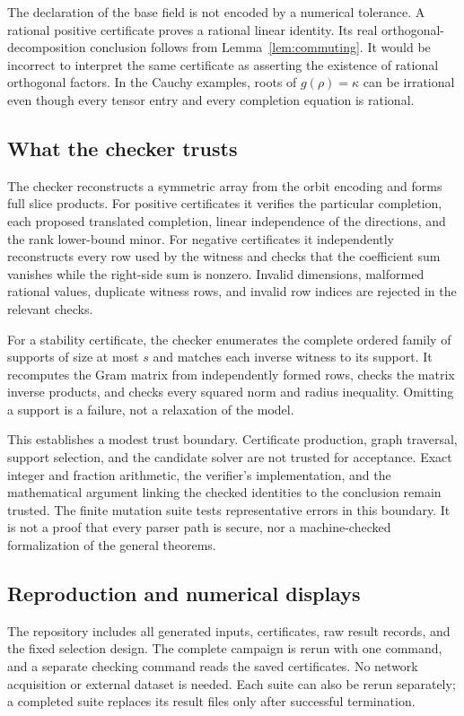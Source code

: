 The declaration of the base field is not encoded by a numerical tolerance. A rational positive certificate proves a rational linear identity. Its real orthogonal-decomposition conclusion follows from Lemma~\ref{lem:commuting}. It would be incorrect to interpret the same certificate as asserting the existence of rational orthogonal factors. In the Cauchy examples, roots of $g(\rho)=\kappa$ can be irrational even though every tensor entry and every completion equation is rational.

\subsection{What the checker trusts}
The checker reconstructs a symmetric array from the orbit encoding and forms full slice products. For positive certificates it verifies the particular completion, each proposed translated completion, linear independence of the directions, and the rank lower-bound minor. For negative certificates it independently reconstructs every row used by the witness and checks that the coefficient sum vanishes while the right-side sum is nonzero. Invalid dimensions, malformed rational values, duplicate witness rows, and invalid row indices are rejected in the relevant checks.

For a stability certificate, the checker enumerates the complete ordered family of supports of size at most $s$ and matches each inverse witness to its support. It recomputes the Gram matrix from independently formed rows, checks the matrix inverse products, and checks every squared norm and radius inequality. Omitting a support is a failure, not a relaxation of the model.

This establishes a modest trust boundary. Certificate production, graph traversal, support selection, and the candidate solver are not trusted for acceptance. Exact integer and fraction arithmetic, the verifier's implementation, and the mathematical argument linking the checked identities to the conclusion remain trusted. The finite mutation suite tests representative errors in this boundary. It is not a proof that every parser path is secure, nor a machine-checked formalization of the general theorems.

\subsection{Reproduction and numerical displays}
The repository includes all generated inputs, certificates, raw result records, and the fixed selection design. The complete campaign is rerun with one command, and a separate checking command reads the saved certificates. No network acquisition or external dataset is needed. Each suite can also be rerun separately; a completed suite replaces its result files only after successful termination.

